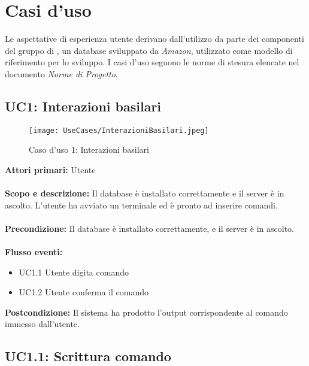 \documentclass{scalatekids-article}
\begin{document}
\section{Casi d'uso}
Le aspettative di esperienza utente derivano dall'utilizzo da parte dei
componenti del gruppo di , un database 
sviluppato da \textit{Amazon}, utilizzato come modello di riferimento per lo
sviluppo. I casi d'uso seguono le norme di stesura elencate nel documento \textit{Norme di Progetto}.%
\subsection{UC1: Interazioni basilari}
\begin{figure}[H]
  \texttt{[image: UseCases/InterazioniBasilari.jpeg]}
  \caption{Caso d'uso 1: Interazioni basilari}
\end{figure}
\textbf{Attori primari:} Utente\\ \\
\textbf{Scopo e descrizione:} Il database è installato correttamente e il server è in ascolto.
L'utente ha avviato un terminale ed è pronto ad inserire comandi.\\ \\
\textbf{Precondizione:} Il database è installato correttamente, e il server è in ascolto.\\ \\
\textbf{Flusso eventi:}
\begin{itemize}
\item UC1.1 Utente digita comando
\item UC1.2 Utente conferma il comando
\end{itemize}
\textbf{Postcondizione:} Il sistema ha prodotto l'output corrispondente al comando immesso dall'utente.
\subsection{UC1.1: Scrittura comando}
\end{document}
